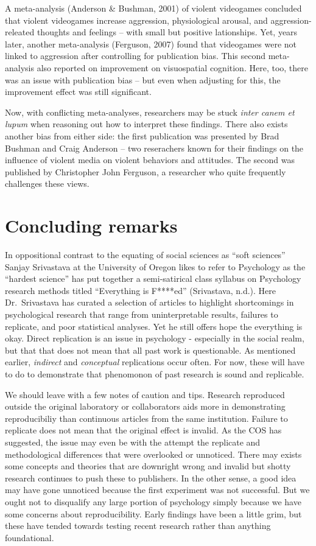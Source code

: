 \documentclass[man]{apa6}
\theoremstyle{definition}
\theoremstyle{definition}
\theoremstyle{definition}
\theoremstyle{remark}
\begin{document}
A meta-analysis (Anderson \& Bushman, 2001) of violent videogames
concluded that violent videogames increase aggression, physiological
arousal, and aggression-releated thoughts and feelings -- with small but
positive lationships. Yet, years later, another meta-analysis (Ferguson,
2007) found that videogames were not linked to aggression after
controlling for publication bias. This second meta-analysis also
reported on improvement on visuospatial cognition. Here, too, there was
an issue with publication bias -- but even when adjusting for this, the
improvement effect was still significant.

Now, with conflicting meta-analyses, researchers may be stuck
\emph{inter canem et lupum} when reasoning out how to interpret these
findings. There also exists another bias from either side: the first
publication was presented by Brad Bushman and Craig Anderson -- two
reserachers known for their findings on the influence of violent media
on violent behaviors and attitudes. The second was published by
Christopher John Ferguson, a researcher who quite frequently challenges
these views.

\hypertarget{concluding-remarks}{%
\section{Concluding remarks}\label{concluding-remarks}}

In oppositional contrast to the equating of social sciences as
\enquote{soft sciences} Sanjay Srivastava at the University of Oregon
likes to refer to Psychology as the \enquote{hardest science} has put
together a semi-satirical class syllabus on Psychology research methods
titled \enquote{Everything is F****ed} (Srivastava, n.d.). Here
Dr.~Srivastava has curated a selection of articles to highlight
shortcomings in psychological research that range from uninterpretable
results, failures to replicate, and poor statistical analyses. Yet he
still offers hope the everything is okay. Direct replication is an issue
in psychology - especially in the social realm, but that that does not
mean that all past work is questionable. As mentioned earlier,
\emph{indirect} and \emph{conceptual} replications occur often. For now,
these will have to do to demonstrate that phenomonon of past research is
sound and replicable.

We should leave with a few notes of caution and tips. Research
reproduced outside the original laboratory or collaborators aids more in
demonstrating reproducibiliy than continuous articles from the same
institution. Failure to replicate does not mean that the original effect
is invalid. As the COS has suggested, the issue may even be with the
attempt the replicate and methodological differences that were
overlooked or unnoticed. There may exists some concepts and theories
that are downright wrong and invalid but shotty research continues to
push these to publishers. In the other sense, a good idea may have gone
unnoticed because the first experiment was not successful. But we ought
not to disqualify any large portion of psychology simply because we have
some concerns about reproducibility. Early findings have been a little
grim, but these have tended towards testing recent research rather than
anything foundational.
\end{document}
